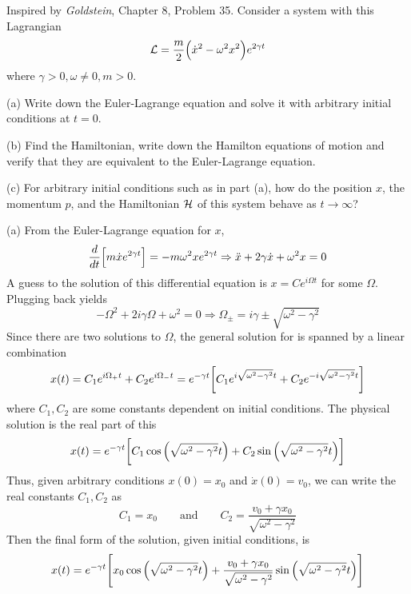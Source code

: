 \documentclass[12pt]{article}
\begin{document}
\begin{problem}{2}
Inspired by \textit{Goldstein}, Chapter 8, Problem 35. Consider a system with
this Lagrangian
\begin{equation}\label{p2:L}
    \mathcal{L}=\frac{m}{2}\qty(\dot{x}^2-\omega^2x^2)e^{2\gamma t} 
\end{equation}
where $\gamma>0,\omega\neq 0, m>0$.

(a) Write down the Euler-Lagrange equation and solve it with arbitrary initial
conditions at $t=0$.

(b) Find the Hamiltonian, write down the Hamilton equations of motion and
verify that they are equivalent to the Euler-Lagrange equation.

(c) For arbitrary initial conditions such as in part (a), how do the position
$x$, the momentum $p$, and the Hamiltonian $\mathcal{H}$ of this system behave as
$t\to\infty$?
\begin{solution}
(a) From the Euler-Lagrange equation for $x$,
\begin{align}
    \frac{d}{dt}\qty[m\dot{x}e^{2\gamma t}]=-m\omega^2xe^{2\gamma t}
    \Rightarrow \ddot{x}+2\gamma\dot{x}+\omega^2x=0
\end{align}
A guess to the solution of this differential equation is $x=Ce^{i\Omega t}$ for
some $\Omega$. Plugging back yields
\begin{equation}
    -\Omega^2+2i\gamma\Omega+\omega^2=0\Rightarrow\Omega_\pm=i\gamma\pm\sqrt{\omega^2-\gamma^2}
\end{equation}
Since there are two solutions to $\Omega$, the general solution for is spanned 
by a linear combination
\begin{equation}
    x(t)=C_1e^{i\Omega_+t}+C_2e^{i\Omega_-t}
    =e^{-\gamma
    t}\qty[C_1e^{i\sqrt{\omega^2-\gamma^2}t}+C_2e^{-i\sqrt{\omega^2-\gamma^2}t}]
\end{equation}
where $C_1,C_2$ are some constants dependent on initial conditions. The physical
solution is the real part of this
\begin{equation}
    x(t)=e^{-\gamma
    t}\qty[C_1\cos\qty(\sqrt{\omega^2-\gamma^2}t)+C_2\sin\qty(\sqrt{\omega^2-\gamma^2}t)] 
\end{equation}
Thus, given arbitrary conditions $x(0)=x_0$ and $\dot{x}(0)=v_0$, we can write
the real constants $C_1,C_2$ as
\begin{equation}
    C_1=x_0\qquad\text{and}\qquad
    C_2=\frac{v_0+\gamma x_0}{\sqrt{\omega^2-\gamma^2}}
\end{equation}
Then the final form of the solution, given initial conditions, is
\begin{equation}\label{p2a:x}
    x(t)=e^{-\gamma
    t}\qty[x_0\cos\qty(\sqrt{\omega^2-\gamma^2}t)+\frac{v_0+\gamma
x_0}{\sqrt{\omega^2-\gamma^2}}\sin\qty(\sqrt{\omega^2-\gamma^2}t)] 
\end{equation}


\end{solution}
\end{problem}
\end{document}
